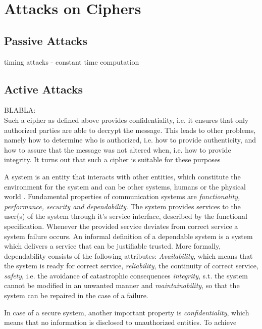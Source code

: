\section{Attacks on Ciphers}

\subsection{Passive Attacks}

timing attacks - constant time computation

\subsection{Active Attacks}


BLABLA:
\\

Such a cipher as defined above provides confidentiality, i.e. it ensures that only authorized parties are able to decrypt the message. This leads to other
problems, namely how to determine who is authorized, i.e. how to provide authenticity, and how to assure that the message was not altered when, i.e. how to 
provide integrity. It turns out that such a cipher is suitable for these purposes

A system is an entity that interacts with other entities, which constitute the environment for the system and
can be other systems, humans or the physical world \cite{1335465}. Fundamental properties of communication systems
are \textit{functionality, performance, security and dependability}. The system provides services to the user(s) 
of the system through it's service interface, described by the functional specification. Whenever the provided service
deviates from correct service a system failure occurs. 
An informal definition of a dependable system is a system which delivers a service that can be justifiable trusted. More formally,
dependability consists of the following attributes:
\textit{Availability}, which means that the system is ready for correct service, \textit{reliability}, the continuity of correct service,
\textit{safety}, i.e. the avoidance of catastrophic consequences \textit{integrity}, s.t. the system cannot be modified in an unwanted manner
and \textit{maintainability}, so that the system can be repaired in the case of a failure.

In case of a secure system, another important property is \textit{confidentiality}, which means that no information is disclosed to unauthorized 
entities.
To achieve 

